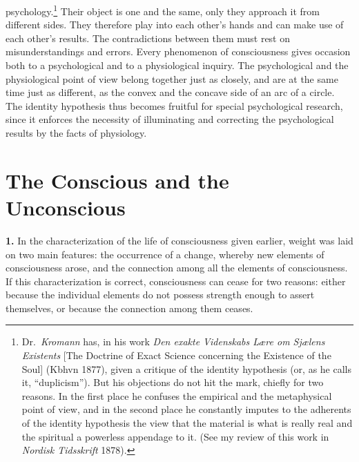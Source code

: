 \documentclass[12pt,a4paper]{book}
\newcommand{\opage}[1]{\marginnote{\footnotesize\textit{[#1]}}}
\begin{document}
psychology.\footnote{Dr.\ \emph{Kromann} has, in his work \textit{Den
exakte Videnskabs Lære om Sjælens Existents} [The Doctrine of Exact
Science concerning the Existence of the Soul] (Kbhvn 1877), given a
critique of the identity hypothesis (or, as he calls it, ``duplicism'').
But his objections do not hit the mark, chiefly for two reasons. In the
first place he confuses the empirical and the metaphysical point of
view, and in the second place he constantly imputes to the adherents of
the identity hypothesis the view that the material is what is really
real and the spiritual a powerless appendage to it. (See my review of
this work in \textit{Nordisk Tidsskrift} 1878).} Their object is one and
the same,
\opage{84}only they approach it from different sides. They therefore
play into each other's hands and can make use of each other's results.
The contradictions between them must rest on misunderstandings and
errors. Every phenomenon of consciousness gives occasion both to a
psychological and to a physiological inquiry. The psychological and the
physiological point of view belong together just as closely, and are at
the same time just as different, as the convex and the concave side of
an arc of a circle. The identity hypothesis thus becomes fruitful for
special psychological research, since it enforces the necessity of
illuminating and correcting the psychological results by the facts of
physiology.


\chapter[The Conscious and the Unconscious]{The Conscious and the Unconscious\opage{85}}
\label{ch:conscious-unconscious}

\noindent\textbf{1.} In the characterization of the life of consciousness
given earlier, weight was laid on two main features: the occurrence of a
change, whereby new elements of consciousness arose, and the connection
among all the elements of consciousness. If this characterization is
correct, consciousness can cease for two reasons: either because the
individual elements do not possess strength enough to assert themselves,
or because the connection among them ceases.
\end{document}
